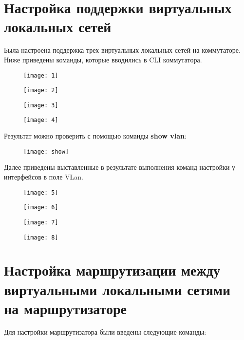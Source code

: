\documentclass[a4paper, 14pt]{article}
\begin{document}
\section*{Настройка поддержки виртуальных локальных сетей}

Была настроена поддержка трех виртуальных локальных сетей на коммутаторе. Ниже приведены команды, которые вводились в CLI коммутатора.

\begin{figure}[H]
    \texttt{[image: 1]}
    \label{fig:1}
\end{figure}
\begin{figure}[H]
    \texttt{[image: 2]}
    \label{fig:1}
\end{figure}
\begin{figure}[H]
    \texttt{[image: 3]}
    \label{fig:1}
\end{figure}
\begin{figure}[H]
    \texttt{[image: 4]}
    \label{fig:1}
\end{figure}

\newpage
Результат можно проверить с помощью команды \textbf{show vlan}:

\begin{figure}[H]
    \texttt{[image: show]}
    \label{fig:1}
\end{figure}

Далее приведены выставленные в результате выполнения команд настройки у интерфейсов в поле VLan.

\begin{figure}[H]
    \texttt{[image: 5]}
    \label{fig:2}
\end{figure}
\begin{figure}[H]
    \texttt{[image: 6]}
    \label{fig:3}
\end{figure}
\begin{figure}[H]
    \texttt{[image: 7]}
    \label{fig:4}
\end{figure}
\begin{figure}[H]
    \texttt{[image: 8]}
    \label{fig:5}
\end{figure}

\newpage
\section*{Настройка маршрутизации между виртуальными локальными сетями на маршрутизаторе}

Для настройки маршрутизатора были введены следующие команды: 
\end{document}
